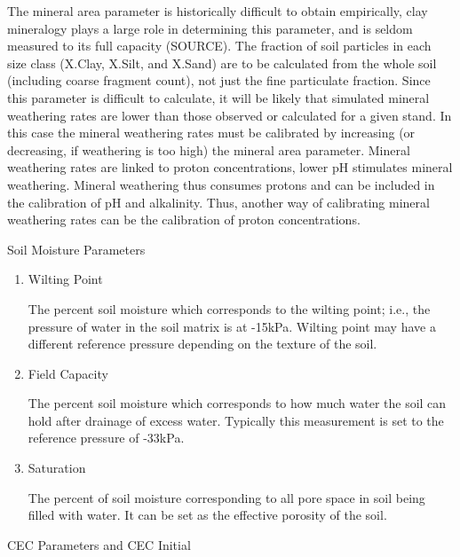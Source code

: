 \documentclass[
]{article}
\begin{document}
The mineral area parameter is historically difficult to obtain
empirically, clay mineralogy plays a large role in determining this
parameter, and is seldom measured to its full capacity (SOURCE). The
fraction of soil particles in each size class (X.Clay, X.Silt, and
X.Sand) are to be calculated from the whole soil (including coarse
fragment count), not just the fine particulate fraction. Since this
parameter is difficult to calculate, it will be likely that simulated
mineral weathering rates are lower than those observed or calculated for
a given stand. In this case the mineral weathering rates must be
calibrated by increasing (or decreasing, if weathering is too high) the
mineral area parameter. Mineral weathering rates are linked to proton
concentrations, lower pH stimulates mineral weathering. Mineral
weathering thus consumes protons and can be included in the calibration
of pH and alkalinity. Thus, another way of calibrating mineral
weathering rates can be the calibration of proton concentrations.

Soil Moisture Parameters

\begin{enumerate}
\def\labelenumi{\arabic{enumi}.}
\item
  Wilting Point

  The percent soil moisture which corresponds to the wilting point;
  i.e., the pressure of water in the soil matrix is at -15kPa. Wilting
  point may have a different reference pressure depending on the texture
  of the soil.
\item
  Field Capacity

  The percent soil moisture which corresponds to how much water the soil
  can hold after drainage of excess water. Typically this measurement is
  set to the reference pressure of -33kPa.
\item
  Saturation

  The percent of soil moisture corresponding to all pore space in soil
  being filled with water. It can be set as the effective porosity of
  the soil.
\end{enumerate}

CEC Parameters and CEC Initial
\end{document}
